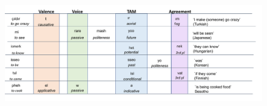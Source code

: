\documentclass[11pt,letterpaper]{article}
\newcounter{def}
\begin{document}
 \begin{figure}
      \includegraphics[width=\textwidth]{figures/verb-morphemes.pdf}
 



\end{figure}
\end{document}
